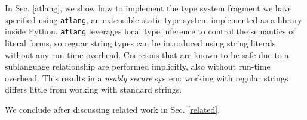 \documentclass[9pt]{sig-alternate}
\theoremstyle{definition}
\newcommand{\lambdas}{\lambda_{RS}}
\newcommand{\stringin}[1]{{\sf stringin}[#1]}
\begin{document}
In Sec. \ref{atlang}, we show how to implement the type system fragment we have specified  using \texttt{atlang}, an extensible static type system implemented as a library inside Python. \texttt{atlang} leverages local type inference to control the semantics of literal forms, so reguar string types can be introduced using string literals without any run-time overhead. Coercions that are known to be  safe due to a sublanguage relationship are performed implicitly, also without run-time overhead. This results in a \emph{usably secure} system: working with regular strings differs little from working with standard strings.

We conclude after discussing related work in Sec. \ref{related}.


\end{document}
